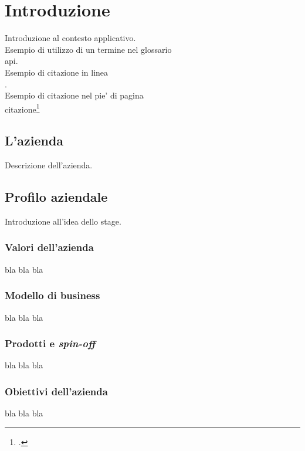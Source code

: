 
\chapter{Introduzione}
\label{cap:introduzione}

Introduzione al contesto applicativo.\\

\noindent Esempio di utilizzo di un termine nel glossario \\
\gls{api}. \\

\noindent Esempio di citazione in linea \\
\cite{site:agile-manifesto}. \\

\noindent Esempio di citazione nel pie' di pagina \\
citazione\footcite{womak:lean-thinking} \\

\section{L'azienda}

Descrizione dell'azienda.

\section{Profilo aziendale}

Introduzione all'idea dello stage.
\subsection{Valori dell'azienda}
bla bla bla
\subsection{Modello di business}
bla bla bla
\subsection{Prodotti e \textit{spin-off}}
bla bla bla
\subsection{Obiettivi dell'azienda}
bla bla bla
